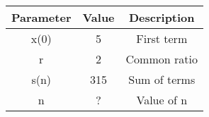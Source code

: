 \begin{tabular}{|c|c|c|}
    \hline
    \textbf{Parameter} & \textbf{Value} & \textbf{Description} \\
    \hline
    x(0) & 5 & First term \\
    \hline
    r & 2 & Common ratio \\
    \hline
    s(n) & 315 & Sum of terms \\
    \hline
    n & ? & Value of n \\
    \hline
\end{tabular}

